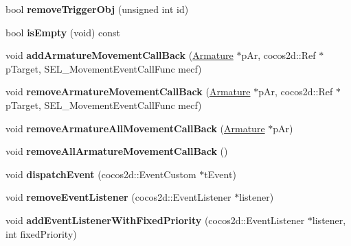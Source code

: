 \begin{DoxyCompactItemize}
bool {\bfseries remove\+Trigger\+Obj} (unsigned int id)
\item 
\mbox{\label{classcocostudio_1_1TriggerMng_a6b20fc71dcd1a658d903c94f5a6aa4a8}} 
bool {\bfseries is\+Empty} (void) const
\item 
\mbox{\label{classcocostudio_1_1TriggerMng_ad27fb21740aaf69104792e3616bb2872}} 
void {\bfseries add\+Armature\+Movement\+Call\+Back} (\hyperlink{classcocostudio_1_1Armature}{Armature} $\ast$p\+Ar, cocos2d\+::\+Ref $\ast$p\+Target, S\+E\+L\+\_\+\+Movement\+Event\+Call\+Func mecf)
\item 
\mbox{\label{classcocostudio_1_1TriggerMng_ad3287cd4501ea7b11b53f6fd88129218}} 
void {\bfseries remove\+Armature\+Movement\+Call\+Back} (\hyperlink{classcocostudio_1_1Armature}{Armature} $\ast$p\+Ar, cocos2d\+::\+Ref $\ast$p\+Target, S\+E\+L\+\_\+\+Movement\+Event\+Call\+Func mecf)
\item 
\mbox{\label{classcocostudio_1_1TriggerMng_aa17fdff3d21ae78577a5347aaf22c35e}} 
void {\bfseries remove\+Armature\+All\+Movement\+Call\+Back} (\hyperlink{classcocostudio_1_1Armature}{Armature} $\ast$p\+Ar)
\item 
\mbox{\label{classcocostudio_1_1TriggerMng_a012a8aa923f23db224aec14e60cee54a}} 
void {\bfseries remove\+All\+Armature\+Movement\+Call\+Back} ()
\item 
\mbox{\label{classcocostudio_1_1TriggerMng_a06695a400b6aa2ff5353db50e632cad6}} 
void {\bfseries dispatch\+Event} (cocos2d\+::\+Event\+Custom $\ast$t\+Event)
\item 
\mbox{\label{classcocostudio_1_1TriggerMng_ab52f0e7456e133a49d418071c611f20c}} 
void {\bfseries remove\+Event\+Listener} (cocos2d\+::\+Event\+Listener $\ast$listener)
\item 
\mbox{\label{classcocostudio_1_1TriggerMng_a1333f6179748f1c2c98e1b075105f047}} 
void {\bfseries add\+Event\+Listener\+With\+Fixed\+Priority} (cocos2d\+::\+Event\+Listener $\ast$listener, int fixed\+Priority)

\end{DoxyCompactItemize}
